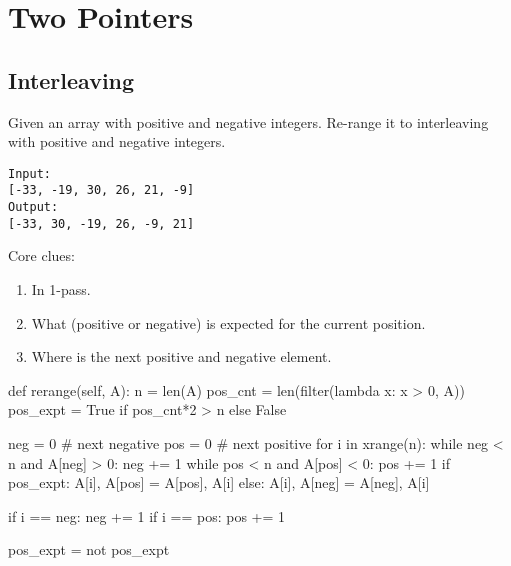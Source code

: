 \section{Two Pointers}
\subsection{Interleaving}
 Given an array with positive and negative integers. Re-range it to interleaving with positive and negative integers.
\begin{lstlisting}
Input:
[-33, -19, 30, 26, 21, -9]
Output:
[-33, 30, -19, 26, -9, 21]
\end{lstlisting}
Core clues:
\begin{enumerate}
\item In 1-pass.
\item What (positive or negative) is expected for the current position.
\item Where is the next positive and negative element.
\end{enumerate}
\begin{python}
def rerange(self, A):
    n = len(A)
    pos_cnt = len(filter(lambda x: x > 0, A))
    pos_expt = True if pos_cnt*2 > n else False

    neg = 0  # next negative
    pos = 0  # next positive
    for i in xrange(n):
        while neg < n and A[neg] > 0: neg += 1
        while pos < n and A[pos] < 0: pos += 1
        if pos_expt:
            A[i], A[pos] = A[pos], A[i]
        else:
            A[i], A[neg] = A[neg], A[i]

        if i == neg: neg += 1
        if i == pos: pos += 1

        pos_expt = not pos_expt
\end{python}
